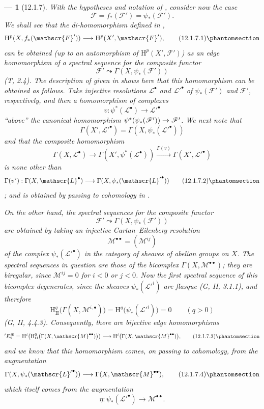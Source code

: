 \documentclass[oneside]{amsart}
\theoremstyle{ega-env-style}
\newtheorem*{env}{---}
\theoremstyle{ega-thm-env-style}
\theoremstyle{ega-defn-env-style}
\def\mathcal{\mathscr}
\def\sh{\mathcal}                   %
\def\HH{\mathrm{H}}                 %
\renewcommand{\to}{\mathchoice{\longrightarrow}{\rightarrow}{\rightarrow}{\rightarrow}}
\newcommand{\oldpage}[2][]{{\marginnote{\normalfont{\textbf{#1}~|~#2}}}\ignorespaces}
\let\EGAOriginalLabel\label
\renewcommand{\label}[1]{\phantomsection\EGAOriginalLabel{#1}}
\begin{document}
\begin{env}[12.1.7]
\label{0.12.1.7}
With the hypotheses and notation of , consider now the
case
\[
  \sh{F}=f_*(\sh{F}')=\psi_*(\sh{F}').
\]
We shall see that the di-homomorphism defined in ,
\[
  \HH^p(X,f_*(\sh{F}'))\longrightarrow\HH^p(X',\sh{F}'),
  \tag{12.1.7.1}
  \label{0.12.1.7.1}
\]
can be obtained (up to an automorphism of $\HH^p(X',\sh{F}')$) as an
edge homomorphism of a spectral sequence for the composite functor
\[
  \sh{F}'\leadsto\Gamma(X,\psi_*(\sh{F}'))
\]
(T, 2.4).
The description of  given in  shows
here that this homomorphism can be obtained as follows.
Take injective resolutions $\sh{L}^\bullet$ and
${\sh{L}'}^\bullet$ of $\psi_*(\sh{F}')$ and $\sh{F}'$,
respectively, and then a homomorphism of complexes
\[
  v:\psi^*(\sh{L}^\bullet)\longrightarrow{\sh{L}'}^\bullet
\]
``above'' the canonical homomorphism
$\psi^*(\psi_*(\sh{F}'))\to\sh{F}'$.
\oldpage[0\textsubscript{III}]{56}
We next note that
\[
  \Gamma(X',{\sh{L}'}^\bullet)
  =\Gamma(X,\psi_*({\sh{L}'}^\bullet))
\]
and that the composite homomorphism
\[
  \Gamma(X,\sh{L}^\bullet)
  \longrightarrow\Gamma(X',\psi^*(\sh{L}^\bullet))
  \xrightarrow{\Gamma(v)}\Gamma(X',{\sh{L}'}^\bullet)
\]
is none other than
\[
  \Gamma(v^\flat):
  \Gamma(X,\sh{L}^\bullet)
  \longrightarrow\Gamma(X,\psi_*({\sh{L}'}^\bullet))
  \tag{12.1.7.2}
  \label{0.12.1.7.2}
\]
; and  is
obtained by passing to cohomology in .

On the other hand, the spectral sequences for the composite functor
\[
  \sh{F}'\leadsto\Gamma(X,\psi_*(\sh{F}'))
\]
are obtained by taking an injective Cartan--Eilenberg resolution
\[
  \sh{M}^{\bullet\bullet}=(\sh{M}^{ij})
\]
of the complex $\psi_*({\sh{L}'}^\bullet)$ in the category of
sheaves of abelian groups on $X$.
The spectral sequences in question are those of the bicomplex
$\Gamma(X,\sh{M}^{\bullet\bullet})$; they are biregular, since
$\sh{M}^{ij}=0$ for $i<0$ or $j<0$.
Now the first spectral sequence of this bicomplex degenerates, since
the sheaves $\psi_*({\sh{L}'}^i)$ are flasque (G, II, 3.1.1), and
therefore
\[
  \HH_\mathrm{II}^q
    \bigl(\Gamma(X,\sh{M}^{i,\bullet})\bigr)
  =\HH^q\bigl(\psi_*({\sh{L}'}^i)\bigr)=0
  \qquad(q>0)
\]
(G, II, 4.4.3).
Consequently, there are bijective edge homomorphisms
\[
  {}'E_2^{i0}
  =\HH^i\!\left(
      \HH_\mathrm{II}^0
        \bigl(\Gamma(X,\sh{M}^{\bullet\bullet})\bigr)
    \right)
  \longrightarrow
  \HH^i\bigl(\Gamma(X,\sh{M}^{\bullet\bullet})\bigr),
  \tag{12.1.7.3}
  \label{0.12.1.7.3}
\]
and we know  that this homomorphism comes, on passing
to cohomology, from the augmentation
\[
  \Gamma(X,\psi_*({\sh{L}'}^\bullet))
  \longrightarrow\Gamma(X,\sh{M}^{\bullet\bullet}),
  \tag{12.1.7.4}
  \label{0.12.1.7.4}
\]
which itself comes from the augmentation
\[
  \eta:\psi_*({\sh{L}'}^\bullet)
  \longrightarrow\sh{M}^{\bullet\bullet}.
\]


\end{env}
\end{document}
